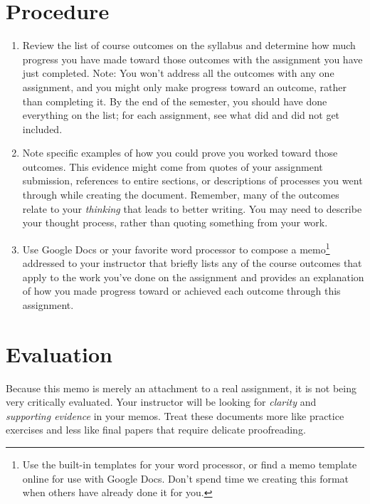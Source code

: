 \documentclass[10pt, oneside]{amsart}	%
\begin{document}
\section{Procedure} %
\label{sec:procedure}
\begin{enumerate}
	\item Review the list of course outcomes on the syllabus and determine how much progress you have made toward those outcomes with the assignment you have just completed. Note: You won't address all the outcomes with any one assignment, and you might only make progress toward an outcome, rather than completing it. By the end of the semester, you should have done everything on the list; for each assignment, see what did and did not get included.
	\item Note specific examples of how you could prove you worked toward those outcomes. This evidence might come from quotes of your assignment submission, references to entire sections, or descriptions of processes you went through while creating the document. Remember, many of the outcomes relate to your \emph{thinking} that leads to better writing. You may need to describe your thought process, rather than quoting something from your work.
	\item Use Google Docs or your favorite word processor to compose a memo\footnote{Use the built-in templates for your word processor, or find a memo template online for use with Google Docs. Don't spend time we creating this format when others have already done it for you.} addressed to your instructor that briefly lists any of the course outcomes that apply to the work you've done on the assignment and provides an explanation of how you made progress toward or achieved each outcome through this assignment.
\end{enumerate}




\section{Evaluation} %
\label{sec:evaluation}
Because this memo is merely an attachment to a real assignment, it is not being very critically evaluated. Your instructor will be looking for \emph{clarity} and \emph{supporting evidence} in your memos. Treat these documents more like practice exercises and less like final papers that require delicate proofreading.
\end{document}
